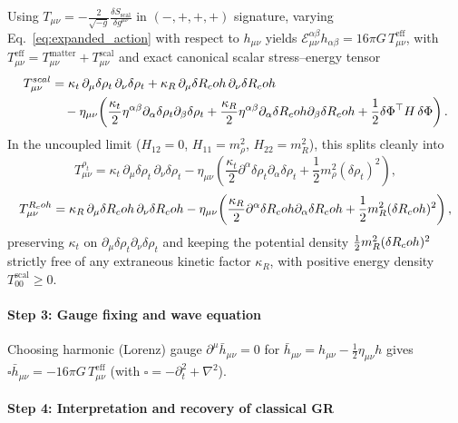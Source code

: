 Using $T_{\mu\nu} = -\frac{2}{\sqrt{-g}}\frac{\delta S_{\mathrm{scal}}}{\delta g^{\mu\nu}}$ in $(-,+,+,+)$ signature, varying Eq.~\eqref{eq:expanded_action} with respect to $h_{\mu\nu}$ yields $\mathcal{E}_{\mu\nu}^{\alpha\beta} h_{\alpha\beta} = 16 \pi G \, T_{\mu\nu}^{\mathrm{eff}}$, with $T_{\mu\nu}^{\mathrm{eff}} = T_{\mu\nu}^{\mathrm{matter}} + T_{\mu\nu}^{\mathrm{scal}}$ and exact canonical scalar stress--energy tensor
\begin{align*}
T_{\mu\nu}^{scal}
&= \kappa_t\,\partial_\mu \delta \rho_t\,\partial_\nu \delta \rho_t
 + \kappa_R\,\partial_\mu \delta R_coh\,\partial_\nu \delta R_coh \\
&\quad - \eta_{\mu\nu}\!\left(
  \frac{\kappa_t}{2}\eta^{\alpha\beta}\partial_\alpha\delta\rho_t\partial_\beta\delta\rho_t
  + \frac{\kappa_R}{2}\eta^{\alpha\beta}\partial_\alpha\delta R_coh\partial_\beta\delta R_coh
  + \frac{1}{2}\delta\Phi^\top H\,\delta\Phi
\right).
\end{align*}
In the uncoupled limit ($H_{12} = 0$, $H_{11} = m_\rho^2$, $H_{22} = m_R^2$), this splits cleanly into
\[
T_{\mu\nu}^{\rho_t} = \kappa_t\,\partial_\mu \delta \rho_t\,\partial_\nu \delta \rho_t - \eta_{\mu\nu}\!\left(\frac{\kappa_t}{2}\partial^\alpha \delta \rho_t \partial_\alpha \delta \rho_t + \frac{1}{2} m_{\rho}^2 (\delta \rho_t)^2\right),
\]
\[
T_{\mu\nu}^{R_coh} = \kappa_R\,\partial_\mu \delta R_coh\,\partial_\nu \delta R_coh - \eta_{\mu\nu}\!\left(\frac{\kappa_R}{2}\partial^\alpha \delta R_coh \partial_\alpha \delta R_coh + \frac{1}{2} m_{R}^2 (\delta R_coh)^2\right),
\]
preserving $\kappa_t$ on $\partial_\mu\delta\rho_t\partial_\nu\delta\rho_t$ and keeping the potential density $\frac{1}{2}m_R^2(\delta R_coh)^2$ strictly free of any extraneous kinetic factor $\kappa_R$, with positive energy density $T_{00}^{\mathrm{scal}} \ge 0$.

\paragraph{Step 3: Gauge fixing and wave equation}

Choosing harmonic (Lorenz) gauge $\partial^\mu \bar{h}_{\mu\nu} = 0$ for $\bar{h}_{\mu\nu} = h_{\mu\nu} - \frac{1}{2}\eta_{\mu\nu} h$ gives $\square \bar{h}_{\mu\nu} = -16\pi G\,T_{\mu\nu}^{\mathrm{eff}}$ (with $\square = -\partial_t^2 + \nabla^2$).

\paragraph{Step 4: Interpretation and recovery of classical GR}

